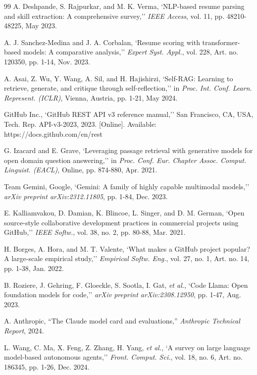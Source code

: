 \documentclass[12pt,a4paper]{report}
\begin{document}
\begin{thebibliography}{99}
A. Deshpande, S. Rajpurkar, and M. K. Verma, `NLP-based resume parsing and skill extraction: A comprehensive survey,'' \textit{IEEE Access}, vol. 11, pp. 48210-48225, May 2023.

A. J. Sanchez-Medina and J. A. Corbalan, `Resume scoring with transformer-based models: A comparative analysis,'' \textit{Expert Syst. Appl.}, vol. 228, Art. no. 120350, pp. 1-14, Nov. 2023.

A. Asai, Z. Wu, Y. Wang, A. Sil, and H. Hajishirzi, `Self-RAG: Learning to retrieve, generate, and critique through self-reflection,'' in \textit{Proc. Int. Conf. Learn. Represent. (ICLR)}, Vienna, Austria, pp. 1-21, May 2024.

GitHub Inc., `GitHub REST API v3 reference manual,'' San Francisco, CA, USA, Tech. Rep. API-v3-2023, 2023. [Online]. Available: https://docs.github.com/en/rest

G. Izacard and E. Grave, `Leveraging passage retrieval with generative models for open domain question answering,'' in \textit{Proc. Conf. Eur. Chapter Assoc. Comput. Linguist. (EACL)}, Online, pp. 874-880, Apr. 2021.

Team Gemini, Google, `Gemini: A family of highly capable multimodal models,'' \textit{arXiv preprint arXiv:2312.11805}, pp. 1-84, Dec. 2023.

E. Kalliamvakou, D. Damian, K. Blincoe, L. Singer, and D. M. German, `Open source-style collaborative development practices in commercial projects using GitHub,'' \textit{IEEE Softw.}, vol. 38, no. 2, pp. 80-88, Mar. 2021.

H. Borges, A. Hora, and M. T. Valente, `What makes a GitHub project popular? A large-scale empirical study,'' \textit{Empirical Softw. Eng.}, vol. 27, no. 1, Art. no. 14, pp. 1-38, Jan. 2022.

B. Roziere, J. Gehring, F. Gloeckle, S. Sootla, I. Gat, \textit{et al.}, `Code Llama: Open foundation models for code,'' \textit{arXiv preprint arXiv:2308.12950}, pp. 1-47, Aug. 2023.

A. Anthropic, ``The Claude model card and evaluations,'' \textit{Anthropic Technical Report}, 2024.

L. Wang, C. Ma, X. Feng, Z. Zhang, H. Yang, \textit{et al.}, `A survey on large language model-based autonomous agents,'' \textit{Front. Comput. Sci.}, vol. 18, no. 6, Art. no. 186345, pp. 1-26, Dec. 2024.


\end{thebibliography}
\end{document}
